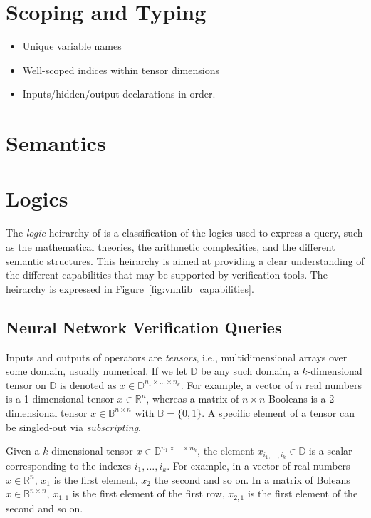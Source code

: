 \section{Scoping and Typing}
\label{sec:scoping_and_typing}


\begin{itemize}
\item Unique variable names
\item Well-scoped indices within tensor dimensions
\item Inputs/hidden/output declarations in order.
\end{itemize}


\section{Semantics}
\label{sec:semantics}



\section{Logics}
\label{sec:query_categories}

The \textit{logic} heirarchy of \vnnlib{} is a classification of the logics used to 
express a query, such as the mathematical theories, the arithmetic complexities, 
and the different semantic structures. This heirarchy is aimed at providing a clear understanding 
of the different capabilities that may be supported by verification tools. The heirarchy 
is expressed in Figure~\ref{fig:vnnlib_capabilities}.

\subsection{Neural Network Verification Queries}

Inputs and outputs of operators are \emph{tensors}, i.e.,
multidimensional arrays over some domain, usually numerical. 
If we let $\mathbb{D}$ be any such domain, a $k$-dimensional 
tensor on $\mathbb{D}$ is denoted as $x \in \mathbb{D}^{n_1 
	\times \ldots \times n_k}$.
For example, a vector of $n$ real numbers is a 1-dimensional
tensor $x \in \mathbb{R}^n$, whereas a matrix of $n \times n$ 
Booleans is a 2-dimensional tensor $x \in \mathbb{B}^{n 
	\times n}$ with $\mathbb{B} = \{0, 1\}$. A specific element 
of a tensor can be singled-out via \emph{subscripting}. 

Given a $k$-dimensional tensor $x \in \mathbb{D}^{n_1 \times 
	\ldots \times n_k}$, the element $x_{i_1, \ldots, i_k} \in 
	\mathbb{D}$ is a scalar corresponding to the indexes 
${i_1, \ldots, i_k}$. For example, in a vector of real numbers 
$x \in \mathbb{R}^n$, $x_1$ is the first element, $x_2$ the second 
and so on. In a matrix of Boleans $x \in \mathbb{B}^{n \times
  n}$, $x_{1,1}$ is the first element of the first row, $x_{2,1}$ 
is the first element of the second and so on.

